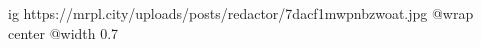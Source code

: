  
 
 
 
 

\ifcmt
  ig https://mrpl.city/uploads/posts/redactor/7dacf1mwpnbzwoat.jpg
  @wrap center
  @width 0.7
\fi
